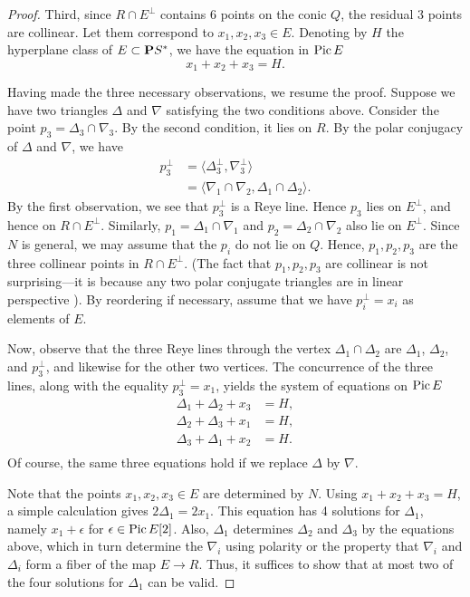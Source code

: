 \documentclass[11pt,reqno]{amsart}
\theoremstyle{plain}
\theoremstyle{definition}
\theoremstyle{remark}
\numberwithin{equation}{section}
\renewcommand{\to}{{\longrightarrow}}
\numberwithin{equation}{section}
\begin{document}
\begin{proof}
  Third, since $R \cap E^\perp$ contains 6 points on the conic $Q$, the residual 3 points are collinear.
  Let them correspond to $x_1, x_2, x_3 \in E$.
  Denoting by $H$ the hyperplane class of $E \subset \P S^*$, we have the equation in $\Pic E$
  \[ x_1 + x_2 + x_3 = H.\]

  Having made the three necessary observations, we resume the proof.
  Suppose we have two triangles $\Delta$ and $\nabla$ satisfying the two conditions above.
  Consider the point $p_3 = \Delta_3 \cap \nabla_3$.
  By the second condition, it lies on $R$.
  By the polar conjugacy of $\Delta$ and $\nabla$, we have
  \begin{align*}
    p_3^\perp &= \langle \Delta_3^\perp, \nabla_3^\perp \rangle \\
              &= \langle  \nabla_1 \cap \nabla_2, \Delta_1 \cap \Delta_2\rangle.
  \end{align*}
  By the first observation, we see that $p_3^\perp$ is a Reye line.
  Hence $p_3$ lies on $E^\perp$, and hence on $R \cap E^\perp$.
  Similarly, $p_1 = \Delta_1 \cap \nabla_1$ and $p_2 = \Delta_2 \cap \nabla_2$ also lie on $E^\perp$.
  Since $N$ is general, we may assume that the $p_i$ do not lie on $Q$.
  Hence, $p_1, p_2, p_3$ are the three collinear points in $R \cap E^\perp$.
  (The fact that $p_1, p_2, p_3$ are collinear is not surprising---it is because any two polar conjugate triangles are in linear perspective \cite[Theorem~2.1.9]{dol:12}).
  By reordering if necessary, assume that we have $p_i^\perp = x_i$ as elements of $E$.

  Now, observe that the three Reye lines through the vertex $\Delta_1 \cap \Delta_2$ are $\Delta_1$, $\Delta_2$, and $p_3^\perp$, and likewise for the other two vertices.
  The concurrence of the three lines, along with the equality $p_3^\perp = x_1$, yields the system of equations on $\Pic E$
  \begin{align*}
    \Delta_1 + \Delta_2 + x_3 &= H, \\
    \Delta_2 + \Delta_3 + x_1 &= H, \\
    \Delta_3 + \Delta_1 + x_2 &= H. \\
  \end{align*}
  Of course, the same three equations hold if we replace $\Delta$ by $\nabla$.

  Note that the points $x_1, x_2, x_3 \in E$ are determined by $N$.
  Using $x_1 + x_2 + x_3 = H$, a simple calculation gives $2 \Delta_1 = 2x_1$.
  This equation has 4 solutions for $\Delta_1$, namely $x_1 + \epsilon$ for $\epsilon \in \Pic E[2]$.
  Also, $\Delta_1$ determines $\Delta_2$ and $\Delta_3$ by the equations above, which in turn determine the $\nabla_i$ using polarity or the property that $\nabla_i$ and $\Delta_i$ form a fiber of the map $E \to R$.
  Thus, it suffices to show that at most two of the four solutions for $\Delta_1$ can be valid.


\end{proof}
\end{document}
